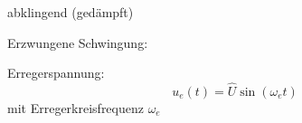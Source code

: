\begin{frame}
{\begin{minipage}[c][4cm][c]{\textwidth}
\begin{minipage}[c][4cm][c]{0.35\textwidth}
        \quad abklingend (gedämpft)
    \end{minipage}
\end{minipage}

\noindent\begin{minipage}[c][4cm][c]{\textwidth}\centering%
    \begin{minipage}[c][4cm][c]{0.25\textwidth}\centering%
    \end{minipage}\hfill
    \begin{minipage}[c][4cm][c]{0.38\textwidth}\centering%
        Erzwungene Schwingung:\newline
    \end{minipage}\hfill%
    \begin{minipage}[c][4cm][c]{0.35\textwidth}%
        Erregerspannung:
        \begin{equation}u_e(t) = \hat{U}\sin(\omega_e t)\end{equation}
        \quad mit Erregerkreisfrequenz $\omega_e$
    \end{minipage}
\end{minipage}
}%
\end{frame}

